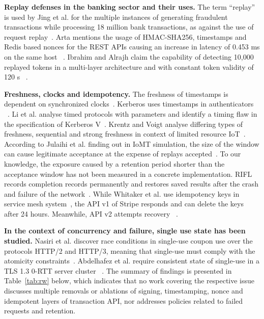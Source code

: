 \documentclass[conference]{IEEEtran}
\begin{document}
\textbf{Replay defenses in the banking sector and their uses.}
The term “replay” is used by Jing et al. for the multiple instances of generating fraudulent transactions while processing 18 million bank transactions, as against the use of request replay~\cite{jing}. Arta mentions the usage of HMAC-SHA256, timestamps and Redis based nonces for the REST APIs causing an increase in latency of 0.453 ms on the same host ~\cite{arta}. Ibrahim and Alrajh claim the capability of detecting 10,000 replayed tokens in a multi-layer architecture and with constant token validity of 120 s ~\cite{ibrahim}. 

\textbf{Freshness, clocks and idempotency.}
The freshness of timestamps is dependent on synchronized clocks~\cite{gong92}. Kerberos uses timestamps in authenticators ~\cite{rfc4120}. Li et al. analyse timed protocols with parameters and identify a timing flaw in the specification of Kerberos V~\cite{li18}. Krentz and Voigt analyse differing types of freshness, sequential and strong freshness in context of limited resource IoT~\cite{krentz24}. According to Julaihi et al. finding out in IoMT simulation, the size of the window can cause legitimate acceptance at the expense of replays accepted~\cite{julaihi26}. To our knowledge, the exposure caused by a retention period shorter than the acceptance window has not been measured in a concrete implementation. RIFL records completion records permanently and restores saved results after the crash and failure of the network~\cite{lee15}. While Whitaker et al. use idempotency keys in service mesh system~\cite{whitaker25}, the API v1 of Stripe responds and can delete the keys after 24 hours. Meanwhile, API v2 attempts recovery ~\cite{stripe}.


\textbf{In the context of concurrency and failure, single use state has been studied.}
Nasiri et al. discover race conditions in single-use coupon use over the protocols HTTP/2 and HTTP/3, meaning that single-use must comply with the atomicity constraints~\cite{nasiri26}. Abdelhafez et al. require consistent state of single-use in a TLS 1.3 0-RTT server cluster ~\cite{tlsguard}. The summary of findings is presented in Table~\ref{tab:rw} below, which indicates that no work covering the respective issue discusses multiple removals or ablations of signing, timestamping, nonce and idempotent layers of transaction API, nor addresses policies related to failed requests and retention.
\end{document}
